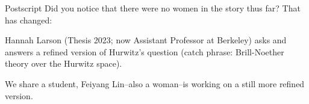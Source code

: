 \documentclass[12pt, aspectratio=169]{beamer}
\begin{document}
\begin{frame}{Postscript} 
Did you notice that there were no women in the story thus far? That has changed: 
\bigskip

 \alert{Hannah Larson} (Thesis 2023; now Assistant Professor at Berkeley) asks and answers a refined version of Hurwitz's question (catch phrase: Brill-Noether theory over the Hurwitz space). 
 \bigskip
 
We share a student, \alert{Feiyang Lin}--also a woman--is working on a still more refined version.
 
\end{frame}
\end{document}
